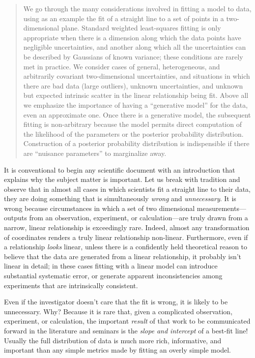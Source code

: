 \documentclass[12pt,twoside,pdftex]{article}
\newcommand{\numberparagraphs}{}
\begin{document}
\begin{abstract}
  We go through the many considerations involved in fitting a model to
  data, using as an example the fit of a straight line to a set of
  points in a two-dimensional plane.  Standard weighted least-squares
  fitting is only appropriate when there is a dimension along which
  the data points have negligible uncertainties, and another along
  which all the uncertainties can be described by Gaussians of known
  variance; these conditions are rarely met in practice.  We consider
  cases of general, heterogeneous, and arbitrarily covariant
  two-dimensional uncertainties, and situations in which there are bad
  data (large outliers), unknown uncertainties, and unknown but
  expected intrinsic scatter in the linear relationship being fit.
  Above all we emphasize the importance of having a ``generative
  model'' for the data, even an approximate one.  Once there is a
  generative model, the subsequent fitting is non-arbitrary because
  the model permits direct computation of the likelihood of the
  parameters or the posterior probability distribution.  Construction
  of a posterior probability distribution is indispensible if there
  are ``nuisance parameters'' to marginalize away.
\end{abstract}

\numberparagraphs

It is conventional to begin any scientific document with an
introduction that explains why the subject matter is important.  Let
us break with tradition and observe that in almost all cases in which
scientists fit a straight line to their data, they are doing something
that is simultaneously \emph{wrong} and \emph{unnecessary}.  It is
wrong because circumstances in which a set of two dimensional
measurements---outputs from an observation, experiment, or
calculation---are truly drawn from a narrow, linear relationship is
exceedingly rare.  Indeed, almost any transformation of coordinates
renders a truly linear relationship non-linear.  Furthermore, even if
a relationship \emph{looks} linear, unless there is a confidently held
theoretical reason to believe that the data are generated from a
linear relationship, it probably isn't linear in detail; in these
cases fitting with a linear model can introduce substantial systematic
error, or generate apparent inconsistencies among experiments that are
intrinsically consistent.

Even if the investigator doesn't care that the fit is wrong, it is
likely to be unnecessary.  Why?  Because it is rare that, given a
complicated observation, experiment, or calculation, the important
\emph{result} of that work to be communicated forward in the
literature and seminars is the \emph{slope and intercept} of a
best-fit line!  Usually the full distribution of data is much more
rich, informative, and important than any simple metrics made by
fitting an overly simple model.
\end{document}
